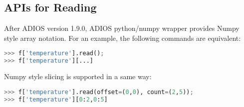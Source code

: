 \subsection{APIs for Reading}
After ADIOS version 1.9.0, ADIOS python/numpy wrapper provides Numpy style array notation. For an example, the following commands are equivalent:
\begin{lstlisting}[language=Python,caption={Numpy style reading},label={},]
>>> f['temperature'].read(); 
>>> f['temperature'][...]
\end{lstlisting}

Numpy style slicing is supported in a same way:
\begin{lstlisting}[language=Python,caption={Numpy style slicing},label={},]
>>> f['temperature'].read(offset=(0,0), count=(2,5)); 
>>> f['temperature'][0:2,0:5]
\end{lstlisting}

